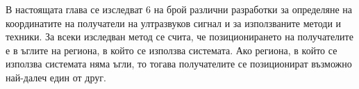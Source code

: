 В настоящата глава се изследват 6 на брой различни разработки за определяне на координатите на получатели на ултразвуков сигнал и за използваните методи и техники. За всеки изследван метод се счита, че позиционирането на получателите е в ъглите на региона, в който се използва системата. Ако региона, в който се използва системата няма ъгли, то тогава получателите се позиционират възможно най-далеч един от друг. 



\pagebreak



\pagebreak



\pagebreak



\pagebreak



\pagebreak


\pagebreak


\pagebreak